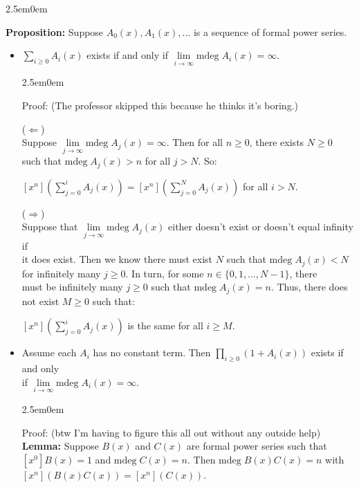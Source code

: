 \documentclass{book}
\newcommand{\hTwo}{%
\color{MidnightBlue}%
   \fontsize{13}{15}\selectfont%
}
\newcommand{\hThree}{%
   \color{PineGreen!85!Orange}
   \fontsize{12}{14}\selectfont%
}
\newcommand{\myComment}{%
   \color{RawerSienna}%
   \fontsize{12}{14}\selectfont%
}
\newenvironment{myIndent}{%
   \begin{adjustwidth}{2.5em}{0em}%
}{%
   \end{adjustwidth}%
}
\newcommand{\blab}[1]{\textbf{#1}}
\newcommand{\mdeg}{\mathrm{mdeg}\phantom{.}}
\newcommand{\retTwo}{\hfill\bigbreak}
\begin{document}
\begin{myIndent}\hTwo
   \blab{Proposition:} Suppose $A_0(x), A_1(x), \ldots$ is a sequence of formal power series.
   \begin{itemize}
      \item $\sum\limits_{i \geq 0} A_i(x)$ exists if and only if $\lim\limits_{i \rightarrow \infty} \mdeg A_i(x) = \infty$.
      
      \begin{myIndent}\hThree
         Proof: {\myComment(The professor skipped this because he thinks it's boring.)}

         ($\Longleftarrow$)\\ [2pt]
         Suppose $\lim\limits_{j \rightarrow \infty} \mdeg A_j(x) = \infty$. Then for all $n \geq 0$, there exists $N \geq 0$ such that $\mdeg A_j(x) > n$ for all $j > N$. So:
         
         {\centering $[x^n]\left(\sum\limits_{j = 0}^i A_j(x)\right) = [x^n]\left(\sum\limits_{j = 0}^N A_j(x)\right)$ for all $i > N$.\retTwo\par}

         ($\Longrightarrow$)\\ [2pt]
         Suppose that $\lim\limits_{j \rightarrow \infty} \mdeg A_j(x)$ either doesn't exist or doesn't equal infinity if\\ [-1pt] it does exist. Then we know there must exist $N$ such that $\mdeg A_j(x) < N$\\ [3pt] for infinitely many $j \geq 0$. In turn, for some $n \in \{0, 1, \ldots, N - 1\}$, there\\ [3pt] must be infinitely many $j \geq 0$ such that $\mdeg A_j(x) = n$. Thus, there does\\ [3pt] not exist $M \geq 0$ such that:

         {\centering $[x^n]\left(\sum\limits_{j = 0}^i A_j(x)\right)$ is the same for all $i \geq M$.  \retTwo\par}
      \end{myIndent}
      
      \item Assume each $A_i$ has no constant term. Then $\prod\limits_{i \geq 0}(1 + A_i(x))$ exists if and only\\ [-8pt] if $\lim\limits_{i \rightarrow \infty} \mdeg A_i(x) = \infty$.
      
      \begin{myIndent}\hThree
         Proof: {\myComment (btw I'm having to figure this all out without any outside help)}\\
         \blab{Lemma:} Suppose $B(x)$ and $C(x)$ are formal power series such that\\ $[x^0]B(x) = 1$ and $\mdeg C(x) = n$. Then $\mdeg B(x)C(x) = n$ with\\ $[x^n](B(x)C(x)) = [x^n](C(x))$.\retTwo


\end{myIndent}
\end{itemize}
\end{myIndent}
\end{document}
